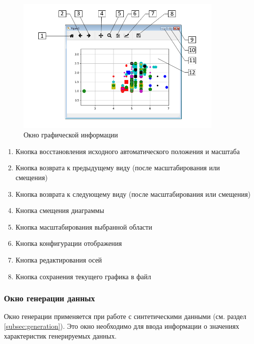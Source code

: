 \documentclass[12pt]{instruction}
\begin{document}
\begin{figure}[h!]
	\centering
	\includegraphics[width=0.9\textwidth]{img/plotview}
	\caption{Окно графической информации}
	\label{fig:plottview}
\end{figure}

\begin{enumerate}
	\item Кнопка восстановления исходного автоматического положения и масштаба
	\item Кнопка возврата к предыдущему виду (после масштабирования или смещения)
	\item Кнопка возврата к следующему виду (после масштабирования или смещения)
	\item Кнопка смещения диаграммы
	\item Кнопка масштабирования выбранной области
	\item Кнопка конфигурации отображения
	\item Кнопка редактирования осей
	\item Кнопка сохранения текущего графика в файл
\end{enumerate}

\subsubsection{Окно генерации данных}

Окно генерации применяется при работе с синтетическими данными (см. раздел \ref{subsec:generation}). Это окно необходимо для ввода информации о значениях характеристик генерируемых данных.
\end{document}

